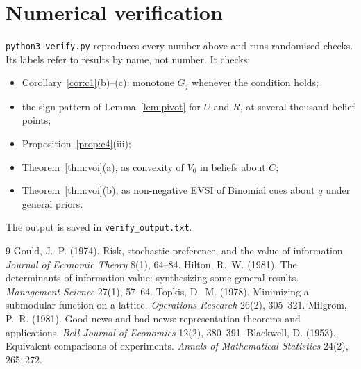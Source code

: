 \documentclass[11pt,a4paper]{article}
\theoremstyle{definition}
\theoremstyle{remark}
\begin{document}
\section*{Numerical verification}
\texttt{python3 verify.py} reproduces every number above and runs randomised checks. Its labels refer to results by name, not number. It checks:
\begin{itemize}[nosep]
\item Corollary~\ref{cor:c1}(b)--(c): monotone $G_j$ whenever the condition holds;
\item the sign pattern of Lemma~\ref{lem:pivot} for $U$ and $R$, at several thousand belief points;
\item Proposition~\ref{prop:c4}(iii);
\item Theorem~\ref{thm:voi}(a), as convexity of $V_0$ in beliefs about $C$;
\item Theorem~\ref{thm:voi}(b), as non-negative EVSI of Binomial cues about $q$ under general priors.
\end{itemize}
The output is saved in \texttt{verify\_output.txt}.

\begin{thebibliography}{9}
 Gould, J.~P. (1974). Risk, stochastic preference, and the value of information. \emph{Journal of Economic Theory} 8(1), 64--84.
 Hilton, R.~W. (1981). The determinants of information value: synthesizing some general results. \emph{Management Science} 27(1), 57--64.
 Topkis, D.~M. (1978). Minimizing a submodular function on a lattice. \emph{Operations Research} 26(2), 305--321.
 Milgrom, P.~R. (1981). Good news and bad news: representation theorems and applications. \emph{Bell Journal of Economics} 12(2), 380--391.
 Blackwell, D. (1953). Equivalent comparisons of experiments. \emph{Annals of Mathematical Statistics} 24(2), 265--272.
\end{thebibliography}
\end{document}
